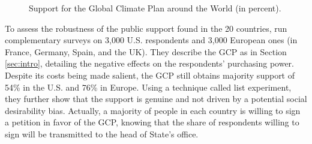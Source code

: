 \documentclass[12pt,english]{article}
\begin{document}
\begin{figure}[h!] 
    \caption{Support for the Global Climate Plan around the World (in percent).}\label{fig:support}
\end{figure}

To assess the robustness of the public support found in the 20 countries, \citet{fabre_international_2023} run complementary surveys on 3,000 U.S. respondents and 3,000 European ones (in France, Germany, Spain, and the UK). They describe the GCP as in Section \ref{sec:intro}, detailing the negative effects on the respondents' purchasing power. Despite its costs being made salient, the GCP still obtains majority support of 54\% in the U.S. and 76\% in Europe. Using a technique called list experiment, they further show that the support is genuine and not driven by a potential social desirability bias. Actually, a majority of people in each country is willing to sign a petition in favor of the GCP, knowing that the share of respondents willing to sign will be transmitted to the head of State's office. 
\end{document}
